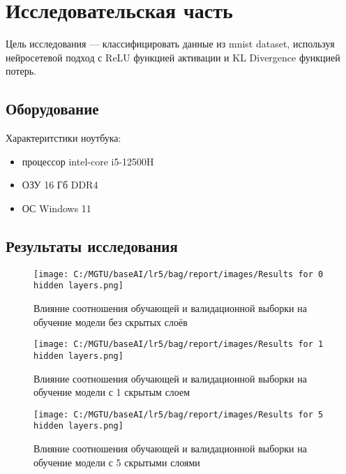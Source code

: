 \chapter{Исследовательская часть}

Цель исследования — классифицировать данные из mnist dataset, используя нейросетевой подход с ReLU функцией активации и KL Divergence функцией потерь.

\section{Оборудование}

Характеритстики ноутбука:
\begin{itemize}
	\item процессор intel-core i5-12500H \cite{lib:intel}
	\item ОЗУ 16 Гб DDR4 
	\item ОС Windows 11 \cite{lib:windows}
\end{itemize}

\section{Результаты исследования}

\begin{figure}[H]
    \centering
    \texttt{[image: C:/MGTU/baseAI/lr5/bag/report/images/Results for 0 hidden layers.png]}
    \caption{Влияние соотношения обучающей и валидационной выборки на обучение модели без скрытых слоёв}
\end{figure}

\begin{figure}[H]
    \centering
    \texttt{[image: C:/MGTU/baseAI/lr5/bag/report/images/Results for 1 hidden layers.png]}
    \caption{Влияние соотношения обучающей и валидационной выборки на обучение модели с 1 скрытым слоем}
\end{figure}

\begin{figure}[H]
    \centering
    \texttt{[image: C:/MGTU/baseAI/lr5/bag/report/images/Results for 5 hidden layers.png]}
    \caption{Влияние соотношения обучающей и валидационной выборки на обучение модели с 5 скрытыми слоями}
\end{figure}

